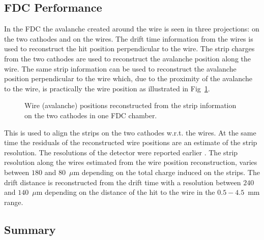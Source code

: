 \subsection{FDC Performance\label{sec:fdcperformance}}
In the FDC the avalanche created around the wire is seen in three projections: on the two cathodes and on the wires.
The drift time information from the wires is used to reconstruct the hit position perpendicular to the wire.
The strip charges from the two cathodes are used to reconstruct the avalanche position along the wire. 
The same strip information can be used to reconstruct the avalanche position perpendicular to the wire which, due to the proximity of the avalanche to the wire, is practically the wire position as illustrated in Fig~\ref{FDC_wires_from_strips}.
\begin{figure}[tbp]
\begin{center}
\caption{\label{FDC_wires_from_strips} Wire (avalanche) positions reconstructed from the strip information on the two cathodes in one FDC chamber.
}   
\end{center}  
\end{figure}
This is used to align the strips on the two cathodes w.r.t. the wires. 
At the same time the residuals of the reconstructed wire positions are an estimate of the strip resolution.
The resolutions of the detector were reported earlier \cite{FDC_NIM}. 
The strip resolution along the wires estimated from the wire position reconstruction, varies between $180$ and $80$~$\mu$m depending on the total charge induced on the strips. The drift distance is reconstructed from the drift time with a resolution between $240$ and $140$~$\mu$m
depending on the distance of the hit to the wire in the $0.5-4.5$~mm range.  

\subsection{Summary \label{sec:dcsummary}}
 
